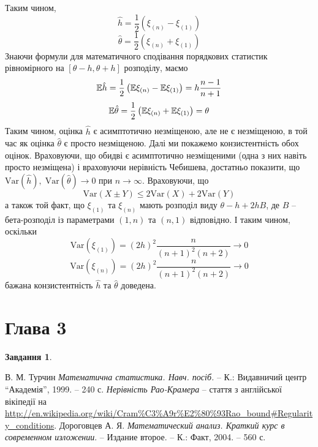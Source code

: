 \documentclass[12pt]{article} %
\newtheorem{prob}{Завдання}
\newcommand{\Var}{\mbox{Var}}
\begin{document}
	Таким чином, \[\hat{h}=\frac{1}{2}(\xi_{(n)}-\xi_{(1)})\]
	\[\hat{\theta}=\frac{1}{2}(\xi_{(n)}+\xi_{(1)})\]
	Знаючи формули для математичного сподівання порядкових статистик рівномірного на $[\theta-h,\theta+h]$ розподілу, маємо
	\[\mathbb{E}\hat{h}=\frac{1}{2}\left(\mathbb{E}\xi_{(n)}-\mathbb{E}\xi_{(1)}\right)=h\frac{n-1}{n+1}\]
	\[\mathbb{E}\hat{\theta}=\frac{1}{2}\left(\mathbb{E}\xi_{(n)}+\mathbb{E}\xi_{(1)}\right)=\theta\]
	Таким чином, оцінка $\hat{h}$ є асимптотично незміщеною, але не є незміщеною, в той час як оцінка $\hat{\theta}$ є просто незміщеною. Далі
	ми покажемо конзистентність обох оцінок. Враховуючи, що обидві є асимптотично незміщеними (одна з них навіть просто незміщена) і враховуючи
	нерівність Чебишева, достатньо показити, що $\Var(\hat{h}),\;\Var({\hat{\theta}})\to0$ при $n\to\infty$.
	Враховуючи, що
	\[\Var(X\pm Y)\leq2\Var(X)+2\Var(Y)\]
	а також той факт, що $\xi_{(1)}$ та $\xi_{(n)}$ мають розподіл виду $\theta-h+2hB$, де $B$ -- бета-розподіл із параметрами $(1,n)$ та $(n,1)$
	відповідно. І таким чином, оскільки
	\[\Var(\xi_{(1)})=(2h)^2\frac{n}{(n+1)^2(n+2)}\to0\]
	\[\Var(\xi_{(n)})=(2h)^2\frac{n}{(n+1)^2(n+2)}\to0\]
	бажана конзистентність $\hat{h}$ та $\hat{\theta}$ доведена.
\section{Глава 3}
\setcounter{prob}{20}
\begin{prob}\end{prob}
\begin{thebibliography}{9}
В. М. Турчин \emph{Математична статистика. Навч. посіб.} --
К.: Видавничий центр ``Академія'', 1999. -- 240 с.
{\em Нерівність Рао-Крамера} -- стаття з англійської вікіпедії на
\url{http://en.wikipedia.org/wiki/Cram%C3%A9r%E2%80%93Rao_bound#Regularity_conditions}.
Дороговцев А. Я. {\em Математический анализ. Краткий курс в современном изложении}. -- Издание второе. --
	К.: Факт, 2004. -- 560 с.
\end{thebibliography}
\end{document}
